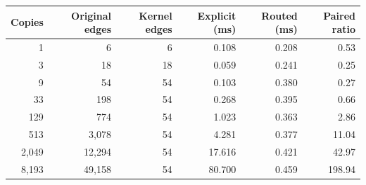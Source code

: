 \begin{center}\small
\begin{tabular}{rrrrrr}
\toprule
Copies & Original edges & Kernel edges & Explicit (ms) & Routed (ms) & Paired ratio\\
\midrule
1 & 6 & 6 & 0.108 & 0.208 & 0.53\\
3 & 18 & 18 & 0.059 & 0.241 & 0.25\\
9 & 54 & 54 & 0.103 & 0.380 & 0.27\\
33 & 198 & 54 & 0.268 & 0.395 & 0.66\\
129 & 774 & 54 & 1.023 & 0.363 & 2.86\\
513 & 3,078 & 54 & 4.281 & 0.377 & 11.04\\
2,049 & 12,294 & 54 & 17.616 & 0.421 & 42.97\\
8,193 & 49,158 & 54 & 80.700 & 0.459 & 198.94\\
\bottomrule
\end{tabular}\end{center}
